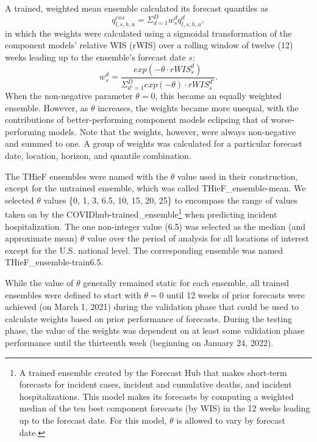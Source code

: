 \documentclass[12pt]{article}
\begin{document}
A trained, weighted mean ensemble calculated its forecast quantiles as \[q_{l,s,h,u}^{ens} = \Sigma_{d=1}^D w_s^d q_{l,s,h,u}^d,\] in which the weights were calculated using a sigmoidal transformation of the component models' relative WIS (rWIS) over a rolling window of twelve (12) weeks leading up to the ensemble's forecast date $s$: \[w_s^d=\frac{exp(-\theta \cdot rWIS_s^d)}{\Sigma_{d'=1}^D exp(-\theta) \cdot rWIS_s^{d'}}.\] When the non-negative parameter $\theta = 0$, this became an equally weighted ensemble. However, as $\theta$ increases, the weights became more unequal, with the contributions of better-performing component models eclipsing that of worse-performing models. Note that the weights, however, were always non-negative and summed to one. A group of weights was calculated for a particular forecast date, location, horizon, and quantile combination\cite{ensemble_methods}.

The THieF ensembles were named with the $\theta$ value used in their construction, except for the untrained ensemble, which was called THieF\_ensemble-mean. We selected $\theta$ values \{0, 1, 3, 6.5, 10, 15, 20, 25\} to encompass the range of values taken on by the COVIDhub-trained\_ensemble\footnote{A trained ensemble created by the Forecast Hub that makes short-term forecasts for incident cases, incident and cumulative deaths, and incident hospitalizations. This model makes its forecasts by computing a weighted median of the ten best component forecasts (by WIS) in the 12 weeks leading up to the forecast date. For this model, $\theta$ is allowed to vary by forecast date\cite{ensembles_info, ensemble_methods}.} when predicting incident hospitalization\cite{ensemble_methods}. The one non-integer value (6.5) was selected as the median (and approximate mean) $\theta$ value over the period of analysis for all locations of interest except for the U.S. national level. The corresponding ensemble was named THieF\_ensemble-train6.5.

While the value of $\theta$ generally remained static for each ensemble, all trained ensembles were defined to start with $\theta = 0$ until 12 weeks of prior forecasts were achieved (on March 1, 2021) during the validation phase that could be used to calculate weights based on prior performance of forecasts. During the testing phase, the value of the weights was dependent on at least some validation phase performance until the thirteenth week (beginning on January 24, 2022).
\end{document}
